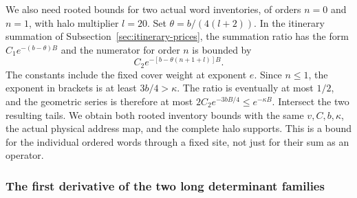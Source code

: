 We also need rooted bounds for two actual word inventories, of orders
$n=0$ and $n=1$, with halo multiplier $l=20$. Set
$\theta=b/(4(l+2))$. In the itinerary summation of
Subsection~\ref{sec:itinerary-prices}, the summation ratio has the form
$C_1e^{-(b-\theta)B}$ and the numerator for order $n$ is bounded by
\[
 C_2e^{-[b-\theta(n+1+l)]B}.
\]
The constants include the fixed cover weight at exponent $e$. Since
$n\leq1$, the exponent in brackets is at least $3b/4>\kappa$.
The ratio is eventually at most $1/2$, and the geometric series is
therefore at most $2C_2e^{-3bB/4}\leq e^{-\kappa B}$.
Intersect the two resulting tails. We obtain both rooted inventory
bounds with the same $v,C,b,\kappa$, the actual physical address map,
and the complete halo supports. This is a bound for the individual
ordered words through a fixed site, not just for their sum as an operator.

\subsubsection{The first derivative of the two long determinant families}

